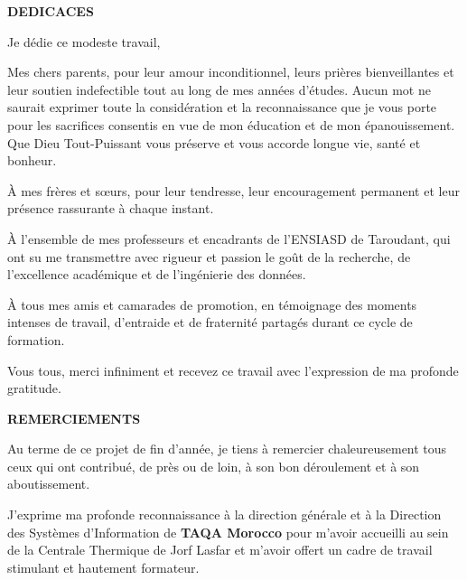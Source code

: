 \documentclass[12pt, a4paper, oneside]{report}
\begin{document}
\setcounter{page}{2}

\newpage
{}
\begin{flushright}
  \textbf{\Large DEDICACES}
\end{flushright}

\vspace{1.0cm}

\noindent Je dédie ce modeste travail,

\vspace{0.4cm}

Mes chers parents, pour leur amour inconditionnel, leurs prières bienveillantes et leur soutien indefectible tout au long de mes années d'études. Aucun mot ne saurait exprimer toute la considération et la reconnaissance que je vous porte pour les sacrifices consentis en vue de mon éducation et de mon épanouissement. Que Dieu Tout-Puissant vous préserve et vous accorde longue vie, santé et bonheur.

À mes frères et sœurs, pour leur tendresse, leur encouragement permanent et leur présence rassurante à chaque instant.

À l'ensemble de mes professeurs et encadrants de l'ENSIASD de Taroudant, qui ont su me transmettre avec rigueur et passion le goût de la recherche, de l'excellence académique et de l'ingénierie des données.

À tous mes amis et camarades de promotion, en témoignage des moments intenses de travail, d'entraide et de fraternité partagés durant ce cycle de formation.

Vous tous, merci infiniment et recevez ce travail avec l'expression de ma profonde gratitude.

\newpage
{}
\begin{flushright}
  \textbf{\Large REMERCIEMENTS}
\end{flushright}

\vspace{1.0cm}

Au terme de ce projet de fin d'année, je tiens à remercier chaleureusement tous ceux qui ont contribué, de près ou de loin, à son bon déroulement et à son aboutissement.

J'exprime ma profonde reconnaissance à la direction générale et à la Direction des Systèmes d'Information de \textbf{TAQA Morocco} pour m'avoir accueilli au sein de la Centrale Thermique de Jorf Lasfar et m'avoir offert un cadre de travail stimulant et hautement formateur.
\end{document}
